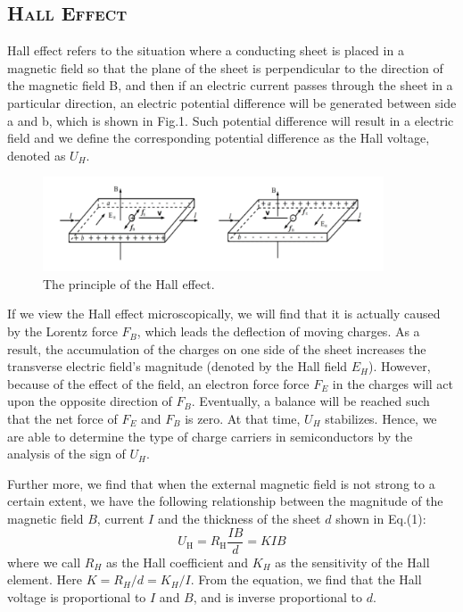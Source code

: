 \documentclass[a4paper,12pt]{article}
\begin{document}
\subsection{\textsc{Hall Effect}}
Hall effect refers to the situation where a conducting sheet is placed in a magnetic field so that the plane of the sheet is perpendicular to the direction of the magnetic field B, and then if an electric current passes through the sheet in a particular direction, an electric potential difference will be generated between side a and b, which is shown in Fig.1. Such potential difference will result in a electric field and we define the corresponding potential difference as the Hall voltage, denoted as $U_H$.

\begin{figure}[htb] 
    \centering
    \includegraphics[width=0.9\textwidth]{Fig1} 
    \caption{The principle of the Hall effect.\cite{labmanual}} 
\end{figure}

If we view the Hall effect microscopically, we will find that it is actually caused by the Lorentz force $F_B$, which leads the deflection of moving charges. As a result, the accumulation of the charges on one side of the sheet increases the transverse electric field's magnitude (denoted by the Hall field $E_H$). However, because of the effect of the field, an electron force force $F_E$ in the charges will act upon the opposite direction of $F_B$. Eventually, a balance will be reached such that the net force of $F_E$ and $F_B$ is zero. At that time, $U_H$ stabilizes. Hence, we are able to determine the type of charge carriers in semiconductors by the analysis of the sign of $U_H$.

Further more, we find that when the external magnetic field is not strong to a certain extent, we have the following relationship between the magnitude of the magnetic field $B$, current $I$ and the thickness of the sheet $d$ shown in Eq.(1):
\begin{equation}
U_{\mathrm{H}}=R_{\mathrm{H}} \frac{I B}{d}=K I B
\end{equation}
where we call $R_H$ as the Hall coefficient and $K_H$ as the sensitivity of the Hall element. Here $K = R_H/d = K_H/I$. From the equation, we find that the Hall voltage is proportional to $I$ and $B$, and is inverse proportional to $d$. 
\end{document}
